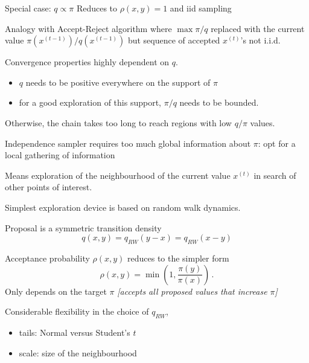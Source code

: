\begin{slide}
\begin{block}{Special case: $q\propto\pi$}
Reduces to $\rho(x,y)=1$ and iid sampling
\end{block}

\pause Analogy with Accept-Reject algorithm where $\max \pi/q$
replaced with the current value $\pi(x^{(t-1)})/q(x^{(t-1)})$ 
but sequence of accepted $x^{(t)}$'s not i.i.d.

\end{slide}\begin{slide}

Convergence properties highly dependent on $q$. 
\begin{itemize}
\item $q$ needs to be positive everywhere on the support of $\pi$
\item for a good exploration of this support, $\pi/q$ needs to be bounded. 
\end{itemize}

\vs\pause Otherwise, the chain takes too long to reach regions with low $q/\pi$ values. 

\end{slide}\begin{slide}

Independence sampler requires too much global information about $\pi$:
opt for a local gathering of information

\vs\pause Means exploration of the neighbourhood of the current value $x^{(t)}$
in search of other points of interest. 

\vs\pause Simplest exploration device is based on random walk dynamics.\\

\end{slide}\begin{slide}

Proposal is a symmetric transition density 
$$
q(x,y)=q_{RW}(y-x)=q_{RW}(x-y)
$$

\vs\pause Acceptance probability $\rho(x,y)$ reduces to the simpler form
$$
\rho(x,y)=\min\left(1,\frac{\pi(y)}{\pi(x)}\right)\,.
$$
Only depends on the target $\pi$ 
{\em [accepts all proposed values that increase $\pi$]}

\end{slide}\begin{slide}

Considerable flexibility in the choice of $q_{RW}$,
\begin{itemize}
\item tails: Normal versus Student's $t$
\item scale: size of the neighbourhood 
\end{itemize}


\end{slide}
